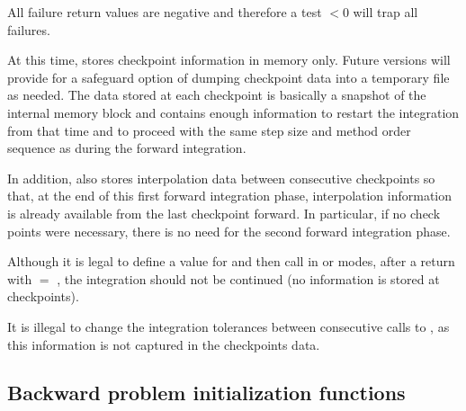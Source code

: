 {
  All failure return values are negative and therefore a test $< 0$
  will trap all  failures.

  At this time,  stores checkpoint information in memory
  only. Future versions will provide for a safeguard option of dumping checkpoint
  data into a temporary file as needed. The data stored at each checkpoint is basically
  a snapshot of the {\idas} internal memory block and contains enough information
  to restart the integration from that time and to proceed with the same step size and
  method order sequence as during the forward integration.
  
  In addition,  also stores interpolation data between consecutive checkpoints
  so that, at the end of this first forward integration phase, interpolation information
  is already available from the last checkpoint forward. In particular,
  if no check points were necessary, there is no need for the second forward integration phase.

  {\warn}Although it is legal to define a value for  and then call 
  in  or  modes, 
  after a return with  $=$ , the integration should not be 
  continued (no  information is stored at checkpoints).

  {\warn}It is illegal to change the integration tolerances between consecutive calls
  to , as this information is not captured in the checkpoints data.
}  

\subsection{Backward problem initialization functions}
\label{sss:idainitb}

